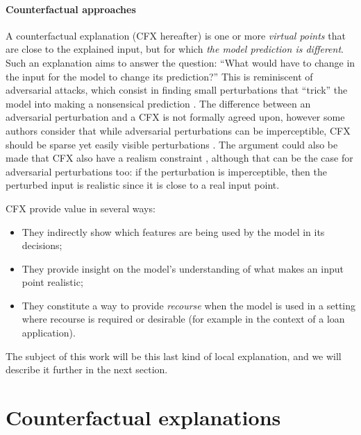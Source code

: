 \documentclass[../main.tex]{subfiles}
\begin{document}

\paragraph{Counterfactual approaches}\label{par:cfx}

A counterfactual explanation (CFX hereafter) is one or more \emph{virtual points} that are close to the explained input, but for which \emph{the model prediction is different}.
Such an explanation aims to answer the question: ``What would have to change in the input for the model to change its prediction?''
This is reminiscent of adversarial attacks, which consist in finding small perturbations that ``trick'' the model into making a nonsensical prediction \cite{szegedyIntriguing2014,moosavi-dezfooliUniversal2017}.
The difference between an adversarial perturbation and a CFX is not formally agreed upon, however some authors consider that while adversarial perturbations can be imperceptible, CFX should be sparse yet easily visible perturbations \cite{laugelLocal2020}. The argument could also be made that CFX also have a realism constraint \citenote{}, although that can be the case for adversarial perturbations too: if the perturbation is imperceptible, then the perturbed input is realistic since it is close to a real input point.

CFX provide value in several ways:
\begin{itemize}
    \item They indirectly show which features are being used by the model in its decisions;
    \item They provide insight on the model's understanding of what makes an input point realistic;
    \item They constitute a way to provide \emph{recourse} when the model is used in a setting where recourse is required or desirable (for example in the context of a loan application).
\end{itemize}

The subject of this work will be this last kind of local explanation, and we will describe it further in the next section.

\section{Counterfactual explanations}
\end{document}
